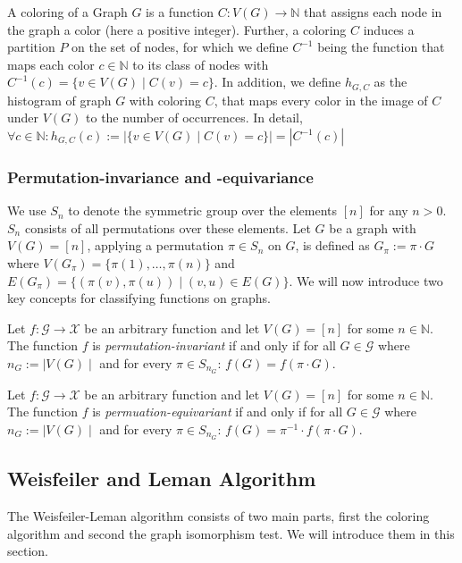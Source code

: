 A coloring of a Graph $G$ is a function $C: V(G) \rightarrow \mathbb{N}$ that assigns each node in the graph a color (here a positive integer). Further, a coloring $C$ induces a partition $P$ on the set of nodes, for which we define $C^{-1}$ being the function that maps each color $c \in \mathbb{N}$ to its class of nodes with $C^{-1}(c) = \{ v\in V(G) \mid C(v) = c\}$. In addition, we define $h_{G, C}$ as the histogram of graph $G$ with coloring $C$, that maps every color in the image of $C$ under $V(G)$ to the number of occurrences. In detail, $\forall c \in \mathbb{N}: h_{G, C}(c) := | \{ v \in V(G) \mid C(v) = c  \} | = | C^{-1}(c) |$

\subsubsection{Permutation-invariance and -equivariance}
We use $S_n$ to denote the symmetric group over the elements $[n]$ for any $n > 0$. $S_n$ consists of all permutations over these elements. Let $G$ be a graph with $V(G) = [n]$, applying a permutation $\pi \in S_n$ on $G$, is defined as $G_\pi := \pi \cdot G$ where $V(G_\pi) = \{\pi(1), \ldots, \pi(n) \}$ and $E(G_\pi) = \{ (\pi(v), \pi(u)) \mid (v,u) \in E(G)\}$. We will now introduce two key concepts for classifying functions on graphs.

\begin{definition}
    Let $f: \mathcal{G} \rightarrow \mathcal{X}$ be an arbitrary function and let $V(G) = [n]$ for some $n \in \mathbb{N}$. The function $f$ is \textit{permutation-invariant} if and only if for all $G \in \mathcal{G}$ where $n_G := \mid V(G) \mid$ and for every $\pi \in S_{n_G}$: $f(G) = f(\pi \cdot G)$.
\end{definition}

\begin{definition}
    Let $f: \mathcal{G} \rightarrow \mathcal{X}$ be an arbitrary function and let $V(G) = [n]$ for some $n \in \mathbb{N}$. The function $f$ is \textit{permuation-equivariant} if and only if for all $G \in \mathcal{G}$ where $n_G := \mid V(G) \mid$ and for every $\pi \in S_{n_G}$: $f(G) = \pi^{-1} \cdot f(\pi \cdot G)$.
\end{definition}

\subsection{Weisfeiler and Leman Algorithm}\label{sec:1-WL Definition}
The Weisfeiler-Leman algorithm consists of two main parts, first the coloring algorithm and second the graph isomorphism test. We will introduce them in this section. 

